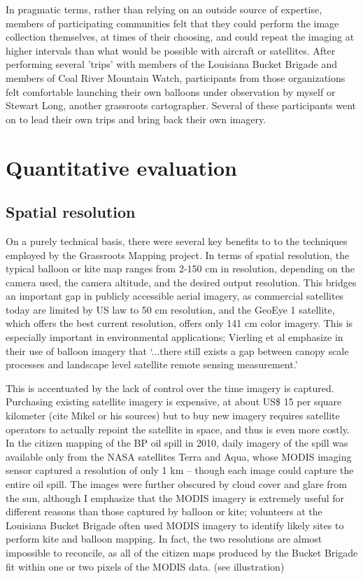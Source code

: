 \documentclass[11pt]{report}
\begin{document}
In pragmatic terms, rather than relying on an outside source of expertise, members of participating communities felt that they could perform the image collection themselves, at times of their choosing, and could repeat the imaging at higher intervals than what would be possible with aircraft or satellites. After performing several 'trips' with members of the Louisiana Bucket Brigade and members of Coal River Mountain Watch, participants from those organizations felt comfortable launching their own balloons under observation by myself or Stewart Long, another grassroots cartographer. Several of these participants went on to lead their own trips and bring back their own imagery.

\section{Quantitative evaluation}

\subsection{Spatial resolution}
 
On a purely technical basis, there were several key benefits to to the techniques employed by the Grassroots Mapping project. In terms of spatial resolution, the typical balloon or kite map ranges from 2-150 cm in resolution, depending on the camera used, the camera altitude, and the desired output resolution. This bridges an important gap in publicly accessible aerial imagery, as commercial satellites today are limited by US law to 50 cm resolution, and the GeoEye 1 satellite, which offers the best current resolution, offers only 141 cm color imagery. This is especially important in environmental applications; Vierling et al emphasize in their use of balloon imagery that `...there still exists a gap between canopy scale processes and landscape level satellite remote sensing measurement.' \cite{vierling2006short} 


This is accentuated by the lack of control over the time imagery is captured. Purchasing existing satellite imagery is expensive, at about US\$ 15 per square kilometer (cite Mikel or his sources) but to buy new imagery requires satellite operators to actually repoint the satellite in space, and thus is even more costly. In the citizen mapping of the BP oil spill in 2010, daily imagery of the spill was available only from the NASA satellites Terra and Aqua, whose MODIS imaging sensor captured a resolution of only 1 km -- though each image could capture the entire oil spill. The images were further obscured by cloud cover and glare from the sun, although I emphasize that the MODIS imagery is extremely useful for different reasons than those captured by balloon or kite; volunteers at the Louisiana Bucket Brigade often used MODIS imagery to identify likely sites to perform kite and balloon mapping. In fact, the two resolutions are almost impossible to reconcile, as all of the citizen maps produced by the Bucket Brigade fit within one or two pixels of the MODIS data. (see illustration)
\end{document}
